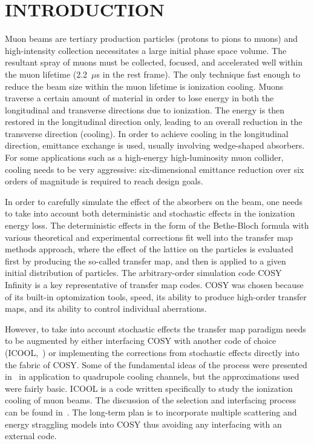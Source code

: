 \documentclass{jacow}
\begin{document}
\section{INTRODUCTION}
Muon beams are tertiary production particles (protons to pions to muons) and high-intensity collection necessitates a large initial phase space volume. The resultant spray of muons must be collected, focused, and accelerated well within the muon lifetime (2.2~$\mu$s in the rest frame). The only technique fast enough to reduce the beam size within the muon lifetime is ionization cooling. Muons traverse a certain amount of material in order to lose energy in both the longitudinal and transverse directions due to ionization. The energy is then restored in the longitudinal direction only, leading to an overall reduction in the transverse direction (cooling). In order to achieve cooling in the longitudinal direction, emittance exchange is used, usually involving wedge-shaped absorbers. For some applications such as a high-energy high-luminosity muon collider, cooling needs to be very aggressive: six-dimensional emittance reduction over six orders of magnitude is required to reach design goals.

In order to carefully simulate the effect of the absorbers on the beam, one needs to take into account both deterministic and stochastic effects in the ionization energy loss. The deterministic effects in the form of the Bethe-Bloch formula with various theoretical and experimental corrections fit well into the transfer map methods approach, where the effect of the lattice on the particles is evaluated first by producing the so-called transfer map, and then is applied to a given initial distribution of particles. The arbitrary-order simulation code COSY Infinity \cite{COSY} is a key representative of transfer map codes. COSY was chosen because of its built-in optomization tools, speed, its ability to produce high-order transfer maps, and its ability to control individual aberrations. 

However, to take into account stochastic effects the transfer map paradigm needs to be augmented by either interfacing COSY with another code of choice (ICOOL,~\cite{ICOOL}) or implementing the corrections from stochastic effects directly into the fabric of COSY. Some of the fundamental ideas of the process were presented in~\cite{errede} in application to quadrupole cooling channels, but the approximations used were fairly basic. ICOOL is a code written specifically to study the ionization cooling of muon beams. The discussion of the selection and interfacing process can be found in~\cite{napac13}. The long-term plan is to incorporate multiple scattering and energy straggling models into COSY thus avoiding any interfacing with an external code.
\end{document}
